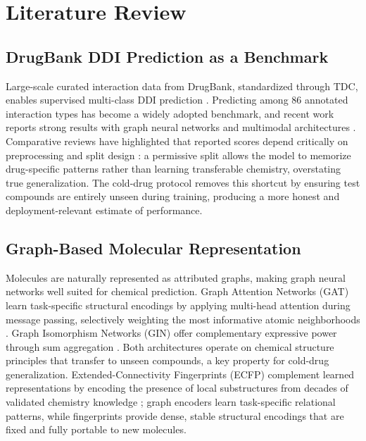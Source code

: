 \documentclass[11pt,a4paper]{report}
\begin{document}
\chapter{Literature Review}

\section{DrugBank DDI Prediction as a Benchmark}

Large-scale curated interaction data from DrugBank, standardized through TDC, enables supervised multi-class DDI prediction \cite{wishart2018drugbank, huang2021tdc}. Predicting among 86 annotated interaction types has become a widely adopted benchmark, and recent work reports strong results with graph neural networks and multimodal architectures \cite{alrabeah2022gnn, xiong2023mrgnn, gupta2024graphddi, abbas2025gnnddi}. Comparative reviews have highlighted that reported scores depend critically on preprocessing and split design \cite{lin2023evaluation, luo2024review}: a permissive split allows the model to memorize drug-specific patterns rather than learning transferable chemistry, overstating true generalization. The cold-drug protocol removes this shortcut by ensuring test compounds are entirely unseen during training, producing a more honest and deployment-relevant estimate of performance.

\section{Graph-Based Molecular Representation}

Molecules are naturally represented as attributed graphs, making graph neural networks well suited for chemical prediction. Graph Attention Networks (GAT) learn task-specific structural encodings by applying multi-head attention during message passing, selectively weighting the most informative atomic neighborhoods \cite{velickovic2018gat}. Graph Isomorphism Networks (GIN) offer complementary expressive power through sum aggregation \cite{xu2019gin}. Both architectures operate on chemical structure principles that transfer to unseen compounds, a key property for cold-drug generalization. Extended-Connectivity Fingerprints (ECFP) complement learned representations by encoding the presence of local substructures from decades of validated chemistry knowledge \cite{rogers2010ecfp}; graph encoders learn task-specific relational patterns, while fingerprints provide dense, stable structural encodings that are fixed and fully portable to new molecules.
\end{document}
